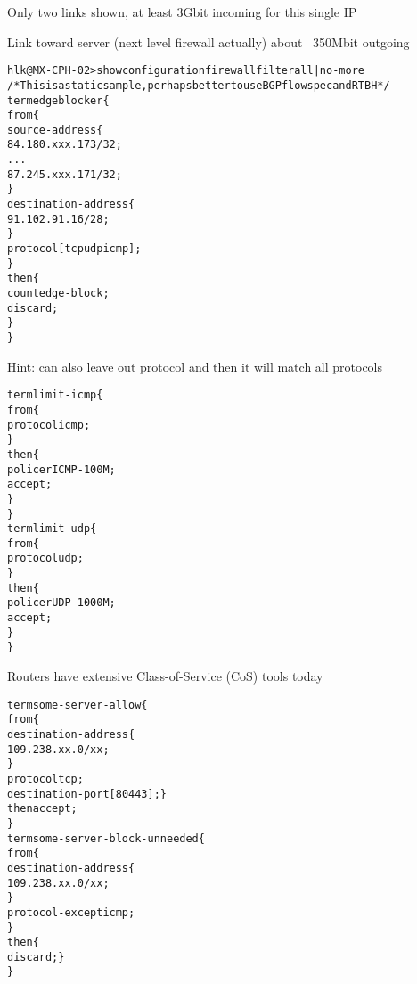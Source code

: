 \documentclass[Screen16to9,17pt]{foils}
\begin{document}
\myquestionspage







\centerline{Only two links shown, at least 3Gbit incoming for this single IP}

\centerline{Link toward server (next level firewall actually) about ~350Mbit outgoing}



\begin{alltt}\footnotesize
hlk@MX-CPH-02> show configuration firewall filter all | no-more
/* This is a static sample, perhaps better to use BGP flowspec and RTBH */
term edgeblocker \{
    from \{
        source-address \{
            84.180.xxx.173/32;
...
            87.245.xxx.171/32;
        \}
        destination-address \{
            91.102.91.16/28;
        \}
        protocol [ tcp udp icmp ];
    \}
    then \{
        count edge-block;
        discard;
    \}
\}
\end{alltt}
Hint: can also leave out protocol and then it will match all protocols


\begin{alltt}\footnotesize
term limit-icmp \{
    from \{
        protocol icmp;
    \}
    then \{
        policer ICMP-100M;
        accept;
    \}
\}
term limit-udp \{
    from \{
        protocol udp;
    \}
    then \{
        policer UDP-1000M;
        accept;
    \}
\}
\end{alltt}

Routers have extensive Class-of-Service (CoS) tools today


\begin{alltt}\footnotesize
term some-server-allow \{
    from \{
        destination-address \{
            109.238.xx.0/xx;
        \}
        protocol tcp;
        destination-port [ 80 443 ];    \}
    then accept;
\}
term some-server-block-unneeded \{
    from \{
        destination-address \{
            109.238.xx.0/xx;
        \}
        protocol-except icmp;
    \}
    then \{
        discard;    \}
\}
\end{alltt}
\end{document}
